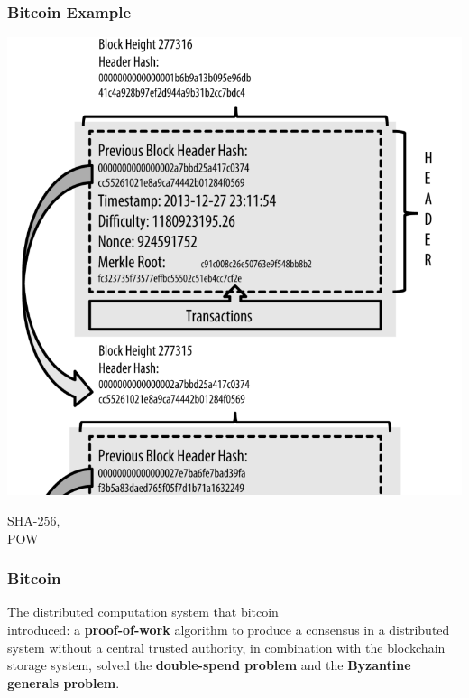 \documentclass{beamer}
\begin{document}
\begin{frame}
\frametitle{Bitcoin Example}

\noindent\begin{minipage}{0.6\textwidth}%
	\includegraphics[width=\linewidth]{btcblocks}
\end{minipage}%
\begin{minipage}{0.3\textwidth}\raggedleft
	SHA-256,\\
	POW
\end{minipage}


\end{frame}

\begin{frame}
	\frametitle{Bitcoin}
The distributed computation system that bitcoin\\ introduced: a \textbf{proof-of-work} algorithm to produce a consensus in a distributed system without a central trusted authority, in combination with the blockchain storage system, solved the \textbf{double-spend problem} and the \textbf{Byzantine generals problem}.
\linebreak
\linebreak	
\linebreak
\linebreak
\end{frame}
\end{document}

